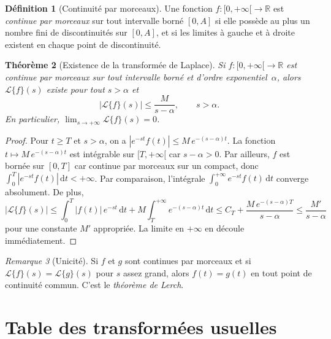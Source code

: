 \documentclass[12pt,a4paper,openany]{book}
\theoremstyle{definition}
\newtheorem{definition}{Définition}[chapter]
\theoremstyle{plain}
\newtheorem{theoreme}[definition]{Théorème}
\theoremstyle{remark}
\newtheorem{remarque}[definition]{Remarque}
\newcommand{\R}{\mathbb{R}}
\newcommand{\dd}{\mathrm{d}}
\newcommand{\abs}[1]{\left|#1\right|}
\begin{document}
\begin{definition}[Continuité par morceaux]\label{def:cont-morceaux}
  Une fonction $f:[0,+\infty[\to\R$ est \emph{continue par morceaux}
  sur tout intervalle borné $[0,A]$ si elle possède au plus un nombre
  fini de discontinuités sur $[0,A]$, et si les limites à gauche et à
  droite existent en chaque point de discontinuité.
\end{definition}

\begin{theoreme}[Existence de la transformée de Laplace]\label{thm:existence-laplace}
  Si $f:[0,+\infty[\to\R$ est continue par morceaux sur tout
  intervalle borné et d'ordre exponentiel~$\alpha$, alors
  $\mathcal{L}\{f\}(s)$ existe pour tout $s>\alpha$ et
  \[
    \abs{\mathcal{L}\{f\}(s)} \leq \frac{M}{s-\alpha},
    \qquad s>\alpha.
  \]
  En particulier, $\lim_{s\to+\infty}\mathcal{L}\{f\}(s)=0$.
\end{theoreme}

\begin{proof}
  Pour $t\geq T$ et $s>\alpha$, on a
  $\abs{e^{-st}f(t)}\leq M\,e^{-(s-\alpha)t}$.
  La fonction $t\mapsto M\,e^{-(s-\alpha)t}$ est intégrable sur
  $[T,+\infty[$ car $s-\alpha>0$. Par ailleurs, $f$ est bornée sur
  $[0,T]$ car continue par morceaux sur un compact, donc
  $\int_0^{T}\abs{e^{-st}f(t)}\,\dd t<+\infty$. Par comparaison,
  l'intégrale $\int_0^{+\infty}e^{-st}f(t)\,\dd t$ converge
  absolument. De plus,
  \[
    \abs{\mathcal{L}\{f\}(s)}
    \leq \int_0^{T}\abs{f(t)}\,e^{-st}\,\dd t
         + M\int_{T}^{+\infty}e^{-(s-\alpha)t}\,\dd t
    \leq C_T + \frac{M\,e^{-(s-\alpha)T}}{s-\alpha}
    \leq \frac{M'}{s-\alpha}
  \]
  pour une constante $M'$ appropriée. La limite en $+\infty$ en
  découle immédiatement.
\end{proof}

\begin{remarque}[Unicité]\label{rem:unicite-laplace}
  Si $f$ et $g$ sont continues par morceaux et si
  $\mathcal{L}\{f\}(s)=\mathcal{L}\{g\}(s)$ pour $s$ assez grand,
  alors $f(t)=g(t)$ en tout point de continuité commun. C'est le
  \emph{théorème de Lerch}.
\end{remarque}

\section{Table des transformées usuelles}\label{sec:table-laplace}
\end{document}
